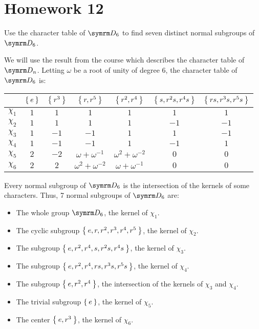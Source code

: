 \section*{Homework 12}

\begin{exercise}
Use the character table of \(\dihedralgroup{6}\) to find seven distinct normal subgroups of \(\dihedralgroup{6}\).
\end{exercise}
\begin{solution}
We will use the result from the course which describes the character table of \(\dihedralgroup{n}\). Letting \(\omega\) be a root of unity of degree 6, the character table of \(\dihedralgroup{6}\) is:
\begin{center}
    \begin{tabular}{c|c|c|c|c|c|c}
        & \(\Set{e}\) & \(\Set{r^3}\) & \(\Set{r, r^5}\) & \(\Set{r^2, r^4}\) & \(\Set{s, r^2 s, r^4 s}\) & \(\Set{rs, r^3 s, r^5 s}\) \\
        \hline
        \(\chi_1\) & \(1\) & \(1\) & \(1\) & \(1\) & \(1\) & \(1\) \\
        \hline
        \(\chi_2\) & \(1\) & \(1\) & \(1\) & \(1\) & \(-1\) & \(-1\) \\
        \hline
        \(\chi_3\) & \(1\) & \(-1\) & \(-1\) & \(1\) & \(1\) & \(-1\) \\
        \hline
        \(\chi_4\) & \(1\) & \(-1\) & \(-1\) & \(1\) & \(-1\) & \(1\) \\
        \hline
        \(\chi_5\) & \(2\) & \(-2\) & \(\omega + \omega^{-1}\) & \(\omega^2 + \omega^{-2}\) & \(0\) & \(0\) \\
        \hline
        \(\chi_6\) & \(2\) & \(2\) & \(\omega^2 + \omega^{-2}\) & \(\omega + \omega^{-1}\) & \(0\) & \(0\)
    \end{tabular}
\end{center}

Every normal subgroup of \(\dihedralgroup{6}\) is the intersection of the kernels of some characters. Thus, 7 normal subgroups of \(\dihedralgroup{6}\) are:
\begin{itemize}
    \item The whole group \(\dihedralgroup{6}\), the kernel of \(\chi_1\).
    \item The cyclic subgroup \(\Set{e, r, r^2, r^3, r^4, r^5}\), the kernel of \(\chi_2\).
    \item The subgroup \(\Set{e, r^2, r^4, s, r^2 s, r^4 s}\), the kernel of \(\chi_3\).
    \item The subgroup \(\Set{e, r^2, r^4, rs, r^3 s, r^5 s}\), the kernel of \(\chi_4\).
    \item The subgroup \(\Set{e, r^2, r^4}\), the intersection of the kernels of \(\chi_3\) and \(\chi_4\).
    \item The trivial subgroup \(\Set{e}\), the kernel of \(\chi_5\).
    \item The center \(\Set{e, r^3}\), the kernel of \(\chi_6\).
\end{itemize}
\end{solution}

